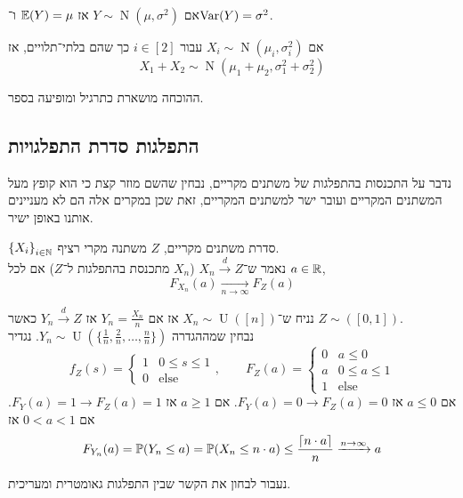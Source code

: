 \begin{conclusion}
	אם $Y \sim \operatorname{N}(\mu, \sigma^2)$ אז $\mathbb{E}(Y) = \mu$ ו־$\operatorname{Var}(Y) = \sigma^2$.
\end{conclusion}
\begin{proposition}
	אם $X_i \sim \operatorname{N}(\mu_i, \sigma_i^2)$ עבור $i \in [2]$ כך שהם בלתי־תלויים, אז
	\[
		X_1 + X_2
		\sim \operatorname{N}(\mu_1 + \mu_2, \sigma_1^2 + \sigma_2^2)
	\]
\end{proposition}
ההוכחה מושארת כתרגיל ומופיעה בספר.

\subsection{התפלגות סדרת התפלגויות}
נדבר על התכנסות בהתפלגות של משתנים מקריים, נבחין שהשם מוזר קצת כי הוא קופץ מעל המשתנים המקריים ועובר ישר למשתנים המקריים, זאת שכן במקרים אלה הם לא מעניינים אותנו באופן ישיר.
\begin{definition}\label{convergence_in_distribution}
	${\{X_i\}}_{i \in \mathbb{N}}$ סדרת משתנים מקריים, $Z$ משתנה מקרי רציף. \\
	נאמר ש־$X_n \xrightarrow{d} Z$ ($X_n$ מתכנסת בהתפלגות ל־$Z$) אם לכל $a \in \mathbb{R}$,
	\[
		F_{X_n}(a) \xrightarrow[n \to \infty]{} F_Z(a)
	\]
\end{definition}
\begin{example}
	נניח ש־$X_n \sim \operatorname{U}([n])$ אז אם $Y_n = \frac{X_n}{n}$ אז $Y_n \xrightarrow{d} Z$ כאשר $Z \sim([0, 1])$. \\
	נבחין שמההגדרה $Y_n \sim \operatorname{U}(\{\frac{1}{n}, \frac{2}{n}, \dots, \frac{n}{n}\})$.
	נגדיר
	\[
		f_Z(s)
		= \begin{cases}
			1 & 0 \le s \le 1 \\
			0 & \text{else}
		\end{cases},
		\qquad
		F_Z(a)
		= \begin{cases}
			0 & a \le 0 \\
			a & 0 \le a \le 1 \\
			1 & \text{else}
		\end{cases}
	\]
	אם $a \le 0$ אז $F_Y(a) = 0 \to F_Z(a) = 0$.
	אם $a \ge 1$ אז $F_Y(a) = 1 \to F_Z(a) = 1$.
	אם $0 < a < 1$ אז
	\[
		F_{Y_n}(a)
		= \mathbb{P}(Y_n \le a)
		= \mathbb{P}(X_n \le n \cdot a)
		\le \frac{\lceil n \cdot a \rceil}{n}
		\xrightarrow{n \to \infty} a
	\]
\end{example}
נעבור לבחון את הקשר שבין התפלגות גאומטרית ומעריכית.
